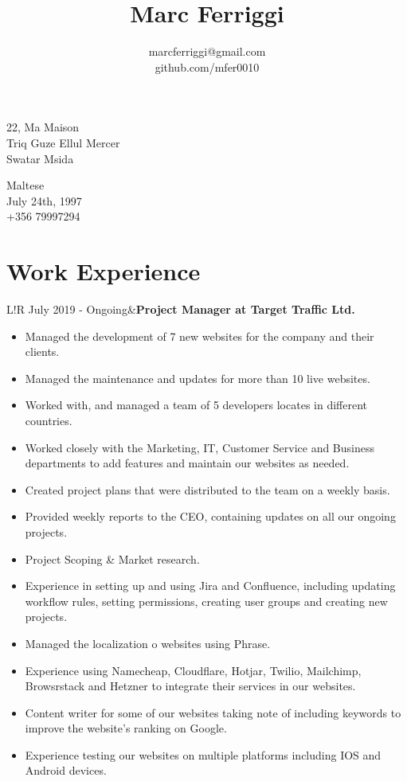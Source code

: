 \documentclass[10pt]{article}
\title{\bfseries\Huge Marc Ferriggi}
\author{marcferriggi@gmail.com\\github.com/mfer0010}
\date{}
\newcommand\VRule{\color{lightgray}\vrule width 0.5pt}
\begin{document}
	\maketitle
	
	\begin{minipage}[ht]{0.75\textwidth}
		22, Ma Maison\\
		Triq Guze Ellul Mercer\\
		Swatar Msida
	\end{minipage}
	\begin{minipage}[ht]{0.2\textwidth}
		Maltese\\
		July 24th, 1997\\
		+356 79997294
	\end{minipage}
	\vspace{15pt}
	\section*{Work Experience}
	\begin{tabular}{L!{\VRule}R}
		July 2019 - Ongoing&\textbf{Project Manager at Target Traffic Ltd.}
		\begin{itemize}
			\renewcommand\labelitemi{-$>$}
			\item Managed the development of 7 new websites for the company and their clients.
			\item Managed the maintenance and updates for more than 10 live websites.
			\item Worked with, and managed a team of 5 developers locates in different countries.
			\item Worked closely with the Marketing, IT, Customer Service and Business departments to add features and maintain our websites as needed.
			\item Created project plans that were distributed to the team on a weekly basis.
			\item Provided weekly reports to the CEO, containing updates on all our ongoing projects.
			\item Project Scoping \& Market research.
			\item Experience in setting up and using Jira and Confluence, including updating workflow rules, setting permissions, creating user groups and creating new projects.
			\item Managed the localization o websites using Phrase.
			\item Experience using Namecheap, Cloudflare, Hotjar, Twilio, Mailchimp, Browsrstack and Hetzner to integrate their services in our websites.
			\item Content writer for some of our websites taking note of including keywords to improve the website's ranking on Google.
			\item Experience testing our websites on multiple platforms including IOS and Android devices.
		\end{itemize}\\
	\end{tabular}\\
\end{document}
